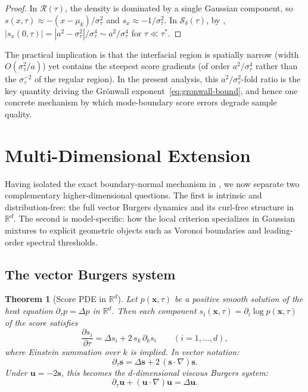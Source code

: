\documentclass[11pt]{article}
\newtheorem{theorem}{Theorem}[section]
\newcommand{\R}{\mathbb{R}}
\begin{document}
\begin{proof}
In $\mathcal{R}(\tau)$, the density is dominated by a single Gaussian component, so $s(x,\tau) \approx -(x - \mu_k)/\sigma_\tau^2$ and $s_x \approx -1/\sigma_\tau^2$.
In $\mathcal{S}_\delta(\tau)$, by , $|s_x(0,\tau)| = |a^2 - \sigma_\tau^2|/\sigma_\tau^4 \sim a^2/\sigma_\tau^4$ for $\tau \ll \tau^\ast$.
\end{proof}

The practical implication is that the interfacial region is spatially narrow (width $O(\sigma_\tau^2/a)$) yet contains the steepest score gradients (of order $a^2/\sigma_\tau^4$ rather than the $\sigma_\tau^{-2}$ of the regular region).
In the present analysis, this $a^2/\sigma_\tau^2$-fold ratio is the key quantity driving the Gr\"onwall exponent~\eqref{eq:gronwall-bound}, and hence one concrete mechanism by which mode-boundary score errors degrade sample quality.


\section{Multi-Dimensional Extension}\label{sec:multidim}

Having isolated the exact boundary-normal mechanism in , we now separate two complementary higher-dimensional questions. The first is intrinsic and distribution-free: the full vector Burgers dynamics and its curl-free structure in $\R^d$. The second is model-specific: how the local criterion specializes in Gaussian mixtures to explicit geometric objects such as Voronoi boundaries and leading-order spectral thresholds.

\subsection{The vector Burgers system}\label{sec:md:vector}

\begin{theorem}[Score PDE in $\R^d$]\label{thm:score-pde-d}
Let $p(\bm{x},\tau)$ be a positive smooth solution of the heat equation $\partial_\tau p = \Delta p$ in $\R^d$.
Then each component $s_i(\bm{x},\tau) = \partial_i \log p(\bm{x},\tau)$ of the score satisfies
\begin{equation}\label{eq:score-pde-d}
  \frac{\partial s_i}{\partial \tau}
  = \Delta s_i + 2\,s_k\,\partial_k s_i
  \qquad (i = 1,\ldots,d),
\end{equation}
where Einstein summation over $k$ is implied.
In vector notation:
\begin{equation}\label{eq:vector-burgers-score}
  \partial_\tau \bm{s} = \Delta \bm{s} + 2\,(\bm{s} \cdot \nabla)\bm{s}.
\end{equation}
Under $\bm{u} = -2\bm{s}$, this becomes the $d$-dimensional viscous Burgers system:
\begin{equation}\label{eq:vector-burgers}
  \partial_\tau \bm{u} + (\bm{u} \cdot \nabla)\bm{u} = \Delta \bm{u}.
\end{equation}
\end{theorem}
\end{document}
